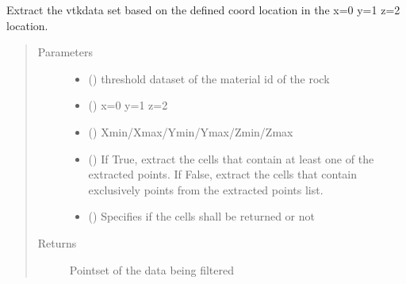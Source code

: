 \documentclass[letterpaper,10pt,english]{sphinxmanual}
\begin{document}
\begin{fulllineitems}
\begin{fulllineitems}
\end{fulllineitems}


\begin{fulllineitems}
\label{\detokenize{openfdem:openfdem.openfdem.Model.extract_based_coord}}
Extract the vtkdata set based on the defined coord location in the x=0 y=1 z=2 location.
\begin{quote}\begin{description}
\item[{Parameters}] \leavevmode\begin{itemize}
\item {} 
 () \textendash{} threshold dataset of the material id of the rock

\item {} 
 () \textendash{} x=0 y=1 z=2

\item {} 
 () \textendash{} Xmin/Xmax/Ymin/Ymax/Zmin/Zmax

\item {} 
 () \textendash{} If True, extract the cells that contain at least one of the extracted points. If False, extract the cells that contain exclusively points from the extracted points list.

\item {} 
 () \textendash{} Specifies if the cells shall be returned or not

\end{itemize}

\item[{Returns}] \leavevmode
Pointset of the data being filtered


\end{description}
\end{quote}
\end{fulllineitems}
\end{fulllineitems}
\end{document}
